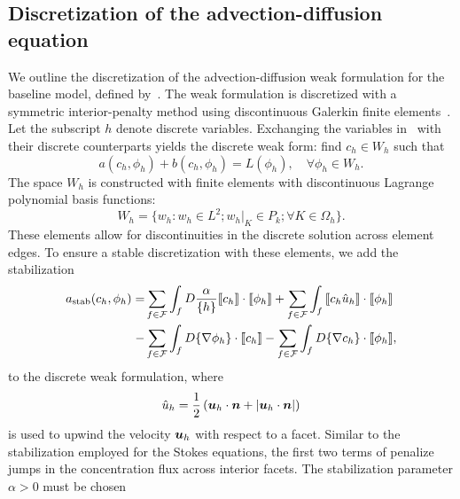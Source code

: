 \documentclass{WileyMSP-template}
\begin{document}
\subsection{Discretization of the advection-diffusion equation}
We outline the discretization of the advection-diffusion weak formulation
for the baseline model, defined
by~.
The weak formulation is discretized with a symmetric interior-penalty method using
discontinuous Galerkin finite elements~\cite{Arnold1982AnElements}.
Let the subscript $h$ denote discrete variables. Exchanging the
variables in~ with their discrete
counterparts yields the discrete weak form: find $c_h\in W_h$ such that
\begin{equation*}
    a(c_h, \phi_h) + b(c_h, \phi_h) = L(\phi_h), \quad\forall\phi_h\in W_h.
\end{equation*}
The space $W_h$ is constructed with finite elements with
discontinuous Lagrange polynomial basis functions:
\begin{equation}
    W_h = \Big\{w_h : w_h\in L^2;  w_h\vert_K\in P_k; \forall K\in\Omega_h\Big\}.
\end{equation}
These elements allow for discontinuities in the discrete solution across element edges.
To ensure a stable discretization with these elements, we add the stabilization
\begin{equation}
    \begin{aligned}
        a_{\mathrm{stab}}(c_h, \phi_h)
        = &\sum_{f\in \mathcal{F}}\int_f{D\frac{\alpha}{\{h\}}\llbracket c_h\rrbracket\cdot\llbracket\phi_h\rrbracket}
        +\sum_{f\in \mathcal{F}}\int_f{\llbracket c_h \hat{u}_h\rrbracket\cdot\llbracket\phi_h\rrbracket}  \\
         -&\sum_{f\in \mathcal{F}}\int_f{D\{\nabla\phi_h\}\cdot\llbracket c_h\rrbracket}
         -\sum_{f\in \mathcal{F}}\int_f{D\{\nabla c_h\}\cdot\llbracket\phi_h\rrbracket},
    \end{aligned}\label{eq:SIP_stabilization}
\end{equation}
to the discrete weak formulation, where
\begin{equation*}
    \hat{u}_h = \frac{1}{2}\left(\bm{u}_h\cdot\bm{n} + \vert\bm{u}_h\cdot\bm{n}\vert\right)
\end{equation*}
is used to upwind the velocity $\bm{u}_h$ with respect to a
facet. Similar to the stabilization employed for the Stokes equations, the first two terms
of  penalize jumps in the concentration flux across interior facets.
The stabilization parameter $\alpha>0$ must be chosen
\end{document}
